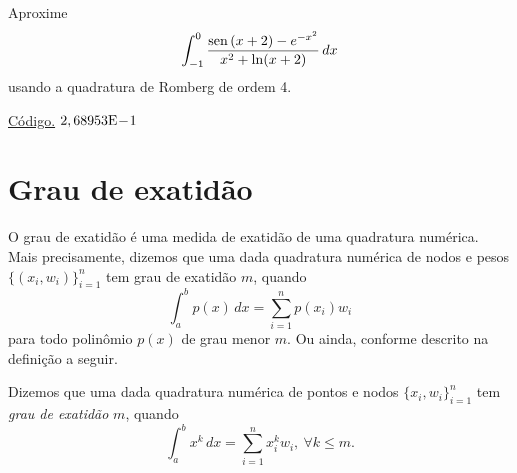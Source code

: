\begin{exer}\label{exer:int_comp_fun}
  Aproxime
  \begin{equation}
    \int_{-1}^0 \frac{\operatorname{sen}\,(x+2)-e^{-x^2}}{x^2+\ln(x+2)}\,dx
  \end{equation}
usando a quadratura de Romberg de ordem 4.
\end{exer}
\begin{resp}
  \ifisoctave 
  \href{https://github.com/phkonzen/notas/blob/master/src/MatematicaNumerica/cap_integr/dados/exer_Romberg_fun/exer_Romberg_fun.m}{Código.} 
  \fi
  $2,68953\mathrm{E}\!-\!1$
\end{resp}

\section{Grau de exatidão}\label{cap_integr_sec_grau_exat}

O grau de exatidão é uma medida de exatidão de uma quadratura numérica. Mais precisamente, dizemos que uma dada quadratura numérica de nodos e pesos $\{(x_i, w_i)\}_{i=1}^n$ tem grau de exatidão $m$, quando
\begin{equation}
  \int_a^b p(x)\,dx = \sum_{i=1}^n p(x_i)w_i
\end{equation}
para todo polinômio $p(x)$ de grau menor $m$. Ou ainda, conforme descrito na definição a seguir.

\begin{defn}
  Dizemos que uma dada quadratura numérica de pontos e nodos $\{x_i, w_i\}_{i=1}^n$ tem \emph{grau de exatidão} $m$, quando
  \begin{equation}
    \int_a^b x^k\,dx = \sum_{i=1}^n x_i^kw_i,~\forall k\leq m.
  \end{equation}
\end{defn}

